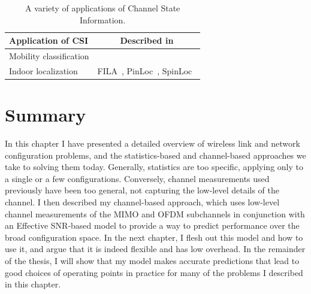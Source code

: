 \begin{table}[tp]
	\centering
	\begin{tabular}{lc}
	\toprule
		\textbf{Application of CSI} & \textbf{Described in} \\
	\midrule
		Mobility classification & \chapref{chap:applications}\\
		Indoor localization & FILA~\cite{Wu_FILA}, PinLoc~\cite{Sen_PinLoc}, SpinLoc~\cite{Sen_SpinLoc} \\ 
	\bottomrule
	\end{tabular}
	\caption[A variety of applications of Channel State Information]{\label{tab:csi_uses}A variety of applications of Channel State Information.}
\end{table}

\section{Summary}
In this chapter I have presented a detailed overview of wireless link and network configuration problems, and the statistics-based and channel-based approaches we take to solving them today. Generally, statistics are too specific, applying only to a single or a few configurations. Conversely, channel measurements used previously have been too general, not capturing the low-level details of the channel. I then described my channel-based approach, which uses low-level channel measurements of the MIMO and OFDM subchannels in conjunction with an Effective SNR-based model to provide a way to predict performance over the broad configuration space. In the next chapter, I flesh out this model and how to use it, and argue that it is indeed flexible and has low overhead. In the remainder of the thesis, I will show that my model makes accurate predictions that lead to good choices of operating points in practice for many of the problems I described in this chapter.

\ifx\mainfile\undefined

\fi

